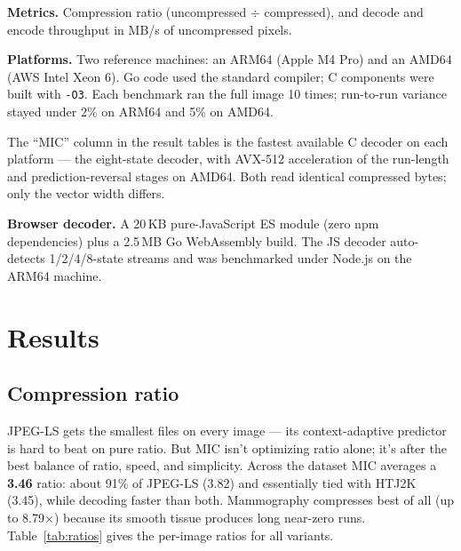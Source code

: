 \documentclass[11pt]{article}
\begin{document}
\textbf{Metrics.} Compression ratio (uncompressed $\div$ compressed), and
decode and encode throughput in MB/s of uncompressed pixels.

\textbf{Platforms.} Two reference machines: an ARM64 (Apple M4 Pro) and an
AMD64 (AWS Intel Xeon 6). Go code used the standard compiler; C components were
built with \texttt{-O3}. Each benchmark ran the full image 10 times;
run-to-run variance stayed under 2\% on ARM64 and 5\% on AMD64.

The ``MIC'' column in the result tables is the fastest available C decoder on
each platform --- the eight-state decoder, with AVX-512 acceleration of the
run-length and prediction-reversal stages on AMD64. Both read identical
compressed bytes; only the vector width differs.

\textbf{Browser decoder.} A 20\,KB pure-JavaScript ES module (zero npm
dependencies) plus a 2.5\,MB Go WebAssembly build. The JS decoder
auto-detects 1/2/4/8-state streams and was benchmarked under Node.js on the
ARM64 machine.

\section{Results}

\subsection{Compression ratio}

JPEG-LS gets the smallest files on every image --- its context-adaptive
predictor is hard to beat on pure ratio. But MIC isn't optimizing ratio
alone; it's after the best balance of ratio, speed, and simplicity. Across
the dataset MIC averages a \textbf{3.46} ratio: about 91\% of JPEG-LS (3.82)
and essentially tied with HTJ2K (3.45), while decoding faster than both.
Mammography compresses best of all (up to 8.79$\times$) because its smooth
tissue produces long near-zero runs. Table~\ref{tab:ratios} gives the
per-image ratios for all variants.
\end{document}

